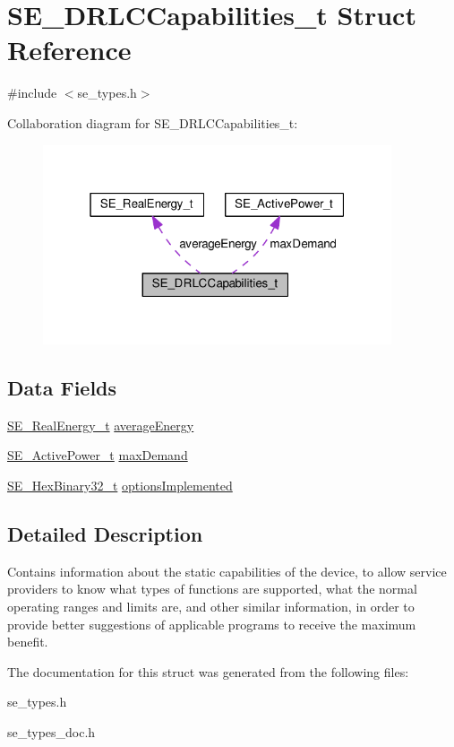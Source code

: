 \hypertarget{structSE__DRLCCapabilities__t}{}\section{S\+E\+\_\+\+D\+R\+L\+C\+Capabilities\+\_\+t Struct Reference}
\label{structSE__DRLCCapabilities__t}


{\ttfamily \#include $<$se\+\_\+types.\+h$>$}



Collaboration diagram for S\+E\+\_\+\+D\+R\+L\+C\+Capabilities\+\_\+t\+:\nopagebreak
\begin{figure}[H]
\begin{center}
\leavevmode
\includegraphics[width=292pt]{structSE__DRLCCapabilities__t__coll__graph}
\end{center}
\end{figure}
\subsection*{Data Fields}
\begin{DoxyCompactItemize}
\item 
\hyperlink{structSE__RealEnergy__t}{S\+E\+\_\+\+Real\+Energy\+\_\+t} \hyperlink{group__DRLCCapabilities_ga6e021a85ef95aff057ee874c073e496e}{average\+Energy}
\item 
\hyperlink{structSE__ActivePower__t}{S\+E\+\_\+\+Active\+Power\+\_\+t} \hyperlink{group__DRLCCapabilities_ga5a0d146e5a4e0b544873034fb4d8b0a4}{max\+Demand}
\item 
\hyperlink{group__HexBinary32_ga062e99a233c4875284116657d048bb98}{S\+E\+\_\+\+Hex\+Binary32\+\_\+t} \hyperlink{group__DRLCCapabilities_gaea3195869d953f2caa66af4cadd8b567}{options\+Implemented}
\end{DoxyCompactItemize}


\subsection{Detailed Description}
Contains information about the static capabilities of the device, to allow service providers to know what types of functions are supported, what the normal operating ranges and limits are, and other similar information, in order to provide better suggestions of applicable programs to receive the maximum benefit. 

The documentation for this struct was generated from the following files\+:\begin{DoxyCompactItemize}
\item 
se\+\_\+types.\+h\item 
se\+\_\+types\+\_\+doc.\+h\end{DoxyCompactItemize}
